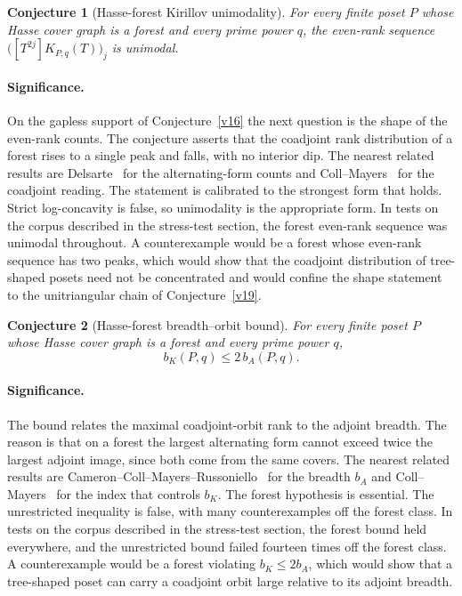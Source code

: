 \documentclass[11pt]{article}
\newtheorem{conjecture}{Conjecture}
\theoremstyle{definition}
\begin{document}
\begin{conjecture}[Hasse-forest Kirillov unimodality]\label{v17}
For every finite poset $P$ whose Hasse cover graph is a forest and every prime power $q$, the even-rank sequence $\bigl([T^{2j}]K_{P,q}(T)\bigr)_j$ is unimodal.
\end{conjecture}

\paragraph{Significance.}
On the gapless support of Conjecture~\ref{v16} the next question is the shape of the even-rank counts.  The conjecture asserts that the coadjoint rank distribution of a forest rises to a single peak and falls, with no interior dip.  The nearest related results are Delsarte~\cite{Del} for the alternating-form counts and Coll--Mayers~\cite{CM} for the coadjoint reading.  The statement is calibrated to the strongest form that holds.  Strict log-concavity is false, so unimodality is the appropriate form.  In tests on the corpus described in the stress-test section, the forest even-rank sequence was unimodal throughout.  A counterexample would be a forest whose even-rank sequence has two peaks, which would show that the coadjoint distribution of tree-shaped posets need not be concentrated and would confine the shape statement to the unitriangular chain of Conjecture~\ref{v19}.

\begin{conjecture}[Hasse-forest breadth--orbit bound]\label{v18}
For every finite poset $P$ whose Hasse cover graph is a forest and every prime power $q$,
\[
b_K(P,q)\le 2\,b_A(P,q).
\]
\end{conjecture}

\paragraph{Significance.}
The bound relates the maximal coadjoint-orbit rank to the adjoint breadth.  The reason is that on a forest the largest alternating form cannot exceed twice the largest adjoint image, since both come from the same covers.  The nearest related results are Cameron--Coll--Mayers--Russoniello~\cite{CCMR} for the breadth $b_A$ and Coll--Mayers~\cite{CM} for the index that controls $b_K$.  The forest hypothesis is essential.  The unrestricted inequality is false, with many counterexamples off the forest class.  In tests on the corpus described in the stress-test section, the forest bound held everywhere, and the unrestricted bound failed fourteen times off the forest class.  A counterexample would be a forest violating $b_K\le 2b_A$, which would show that a tree-shaped poset can carry a coadjoint orbit large relative to its adjoint breadth.
\end{document}
